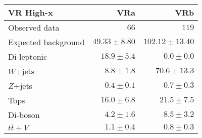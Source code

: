 \begin{table}
  \begin{center}
    \caption{ \label{tab::BGestimation::VRyields_Highx}   }

    \begin{tabular*}{\textwidth}{@{\extracolsep{\fill}}lrr}
      \toprule
      \textbf{VR High-x}  & VRa & VRb  \\
      \midrule

Observed data & $66$ & $119$ \\
\midrule
Expected background & $49.33 \pm 8.80$ & $102.12 \pm 13.40$ \\
\midrule
Di-leptonic & $18.9 \pm 5.4$ & $0.0 \pm 0.0$ \\
$W$+jets & $8.8 \pm 1.8$ & $70.6 \pm 13.3$ \\
$Z$+jets & $0.4 \pm 0.1$ & $0.7 \pm 0.3$ \\
Tops & $16.0 \pm 6.8$ & $21.5 \pm 7.5$ \\
Di-boson & $4.2 \pm 1.6$ & $8.5 \pm 3.2$ \\
$t\bar{t}+V$ & $1.1 \pm 0.4$ & $0.8 \pm 0.3$ \\
        \bottomrule
        \end{tabular*}

  \end{center}
\end{table}



